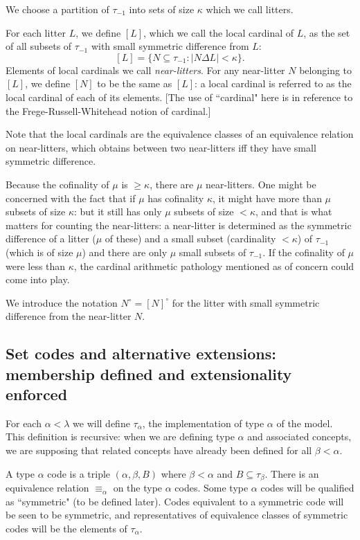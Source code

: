 \documentclass[112pt]{article}
\begin{document}
We choose a partition of $\tau_{-1}$ into sets of size $\kappa$ which we call litters.

For each litter $L$, we define $[L]$, which we call the local cardinal of $L$, as the set of all subsets of $\tau_{-1}$ with small symmetric difference from $L$:  $$[L] = \{N \subseteq \tau_{-1}:|N \Delta L| <\kappa\}.$$    Elements of local cardinals we call {\em near-litters\/}.  For any near-litter $N$ belonging to $[L]$, we define $[N]$ to be the same as $[L]$:  a local cardinal is referred to as the local cardinal of each of its elements.  [The use of ``cardinal" here is in reference to the Frege-Russell-Whitehead notion of cardinal.]

Note that the local cardinals are the equivalence classes of an equivalence relation on near-litters, which obtains between two near-litters iff they have small symmetric difference.

Because the cofinality of $\mu$ is $\geq \kappa$, there are $\mu$ near-litters.   One might be concerned with the fact that if $\mu$ has cofinality $\kappa$, it might have more than $\mu$ subsets of size $\kappa$:  but it still has only $\mu$ subsets of size $<\kappa$, and that is what matters for counting the near-litters:  a near-litter is determined as the symmetric difference of a litter ($\mu$ of these) and a small subset (cardinality $<\kappa$) of $\tau_{-1}$ (which is of size $\mu$) and there are only $\mu$ small subsets of $\tau_{-1}$.  If the cofinality of $\mu$ were less than $\kappa$, the cardinal arithmetic pathology mentioned as of concern could come into play.

We introduce the notation $N^\circ = [N]^\circ$ for the litter with small symmetric difference from the near-litter $N$.

\subsection{Set codes and alternative extensions:  membership defined and extensionality enforced}

For each $\alpha<\lambda$ we will define $\tau_{\alpha}$, the implementation of type $\alpha$ of the model.  This definition is recursive:  when we are defining type $\alpha$ and associated concepts, we are supposing that related concepts have already been defined for all $\beta<\alpha$.

A type $\alpha$ code is a triple $(\alpha,\beta,B)$ where $\beta<\alpha$ and $B \subseteq \tau_{\beta}$.    There is an equivalence relation $\equiv_{\alpha}$ on the type $\alpha$ codes.  Some type $\alpha$ codes will be qualified as ``symmetric" (to be defined later).  Codes equivalent to a symmetric code will be seen to be symmetric, and representatives of equivalence classes of symmetric codes will be the elements of $\tau_\alpha$.
\end{document}
